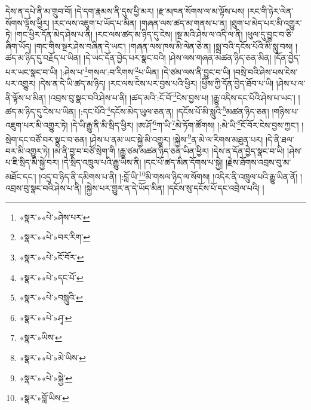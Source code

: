 དེས་ན་དཔེ་ནི་མ་གྲུབ་བོ། །དེ་དག་རྣམས་ནི་དུས་ཕྱི་མར། །རྫ་མཁན་སོགས་ལ་མ་ལྟོས་པས། །རང་གི་ཉེར་ལེན་སོགས་ལྟོས་ཕྱིར། །རང་ལས་འཇུག་པ་ཡོད་པ་མིན། །གཞན་ལས་ཚད་མ་གནས་པ་ན། །ཐུག་པ་མེད་པར་མི་འགྱུར་ཏེ། །གང་ཕྱིར་དོན་མེད་ཤེས་པ་ནི། །རང་ལས་ཚད་མ་ཉིད་དུ་ངེས། །སྔ་མའི་ཤེས་ལ་འདི་ལ་ནི། །ཕུལ་དུ་བྱུང་བ་ཅི་ཞིག་ཡོད། །གང་གིས་སྔར་ཤེས་བཞིན་དེ་ཡང་། །གཞན་ལས་ཁས་མི་ལེན་ཅེ་ན། །སྨྲ་བའི་དངོས་པོའི་མི་སླུ་བས། །ཚད་མ་ཉིད་དུ་བརྗོད་པ་ཡིན། །དེ་ཡང་དོན་བྱེད་པར་སྣང་བའི། །ཤེས་ལས་གཞན་མཚན་ཉིད་ཅན་མིན། །དོན་བྱེད་པར་ཡང་སྣང་བ་ཡི། །:ཤེས་པ་\footnote{«སྣར་»«པེ་»ཤེས་པར་}གསལ་:བ་རིགས་\footnote{«སྣར་»«པེ་»བར་རིག་}པ་ཡིན། །དེ་ཙམ་ལས་ནི་བྱུང་བ་ཡི། །བསྲེ་བའི་ཤེས་པས་ངེས་པར་འགྱུར། །དེས་ན་དེ་ཡི་ཚད་མ་ཉིད། །རང་ལས་ངེས་པར་བྱས་པའི་ཕྱིར། །ཕྱིས་ཀྱི་དོན་བྱེད་ཐོབ་པ་ཡི། །ཤེས་པ་ལ་ནི་ལྟོས་པ་མིན། །འབྲས་བུ་སྣང་བའི་ཤེས་པ་ནི། །ཚད་མའི་:ངོ་བོ་\footnote{«སྣར་»«པེ་»ངོ་བོར་}ངེས་བྱས་པ། །རྒྱུ་འདིས་དང་པོའི་ཤེས་པ་ཡང་། །ཚད་མ་ཉིད་དུ་ངེས་པ་ཡིན། །:དང་པོའི་\footnote{«སྣར་»«པེ་»དང་པོ་}དངོས་མེད་ཡུལ་ཅན་ན། །དངོས་པོ་མི་སླུའི་\footnote{«སྣར་»«པེ་»བསླུའི་}མཚན་ཉིད་ཅན། །གཉིས་པ་འཇུག་པར་མི་འགྱུར་ཏེ། །དེ་ཡི་རྒྱུ་ནི་མི་སྲིད་ཕྱིར། །ཨ་ཤོ་\footnote{«སྣར་»«པེ་»ཤྭ་}ཀ་ཡི་\footnote{«སྣར་»ཡིས་}མེ་ཏོག་ཚོགས། །:མེ་ཡི་\footnote{«སྣར་»«པེ་»མེ་ཡིས་}ངོ་བོར་ངེས་བྱས་ཀྱང་། །སྲེག་དང་བཙོ་བར་སྣང་བ་ཅན། །ཤེས་པ་ནམ་ཡང་སྐྱེ་མི་འགྱུར། །སྐྱེས་\footnote{«སྣར་»«པེ་»སྐྱེ་}ན་མེ་ལ་རིགས་མཐུན་པར། །དེ་ནི་ཐལ་བར་མི་འགྱུར་ཏེ། །མེ་ནི་བྱ་བ་བཙོ་སྲེག་གི །རྒྱུ་ཙམ་མཚན་ཉིད་ཅན་ཡིན་ཕྱིར། །དེས་ན་དོན་བྱེད་སྣང་བ་ཡི། །ཤེས་པ་ཇི་སྲིད་མི་སྐྱེ་བར། །དེ་སྲིད་འཁྲུལ་པའི་རྒྱུ་ཡིས་ནི། །དང་པོ་ཚད་མིན་དོགས་པ་སྐྱེ། །རྗེས་ཐོགས་འབྲས་བུ་མ་མཐོང་དང་། །འདྲ་བ་ཉིད་ནི་དམིགས་པ་ནི། །:བློ་ཡི་\footnote{«སྣར་»བློ་ཡིས་}མི་གསལ་ཉིད་ལ་སོགས། །འདིར་ནི་འཁྲུལ་པའི་རྒྱུ་ཡིན་ནོ། །འབྲས་བུ་སྣང་བའི་ཤེས་པ་ནི། །སྐྱེས་པར་གྱུར་ན་དེ་ཡོད་མིན། །དངོས་སུ་དངོས་པོ་དང་འབྲེལ་པའི། །
